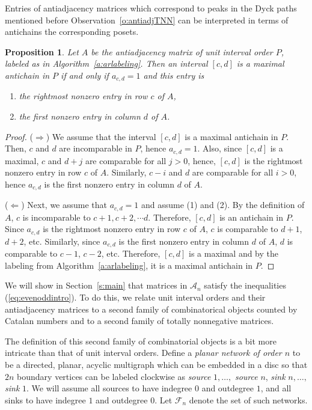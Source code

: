 \documentclass[12pt]{amsart}
\newtheorem{prop}[thm]{Proposition}
\theoremstyle{definition}
\numberwithin{equation}{section}
\newcommand{\A}{\mathcal{A}}
\newcommand{\net}[1]{\mathcal F_{#1}}
\begin{document}
Entries of antiadjacency matrices which correspond to peaks in
the Dyck paths mentioned before Observation~\ref{o:antiadjTNN}
can be interpreted in terms of antichains the corresponding posets.
\begin{prop}\label{p:peak}
  Let $A$ be the antiadjacency matrix of unit interval order $P$,
  labeled as in Algorithm~\ref{a:arlabeling}.  Then an interval $[c,d]$
  is a maximal antichain in $P$ if and only if $a_{c,d} = 1$ and this entry is
  \begin{enumerate}
  \item the rightmost nonzero entry in row $c$ of $A$,
  \item the first nonzero entry in column $d$ of $A$.
  \end{enumerate}
\end{prop}
\begin{proof}

  ($\Rightarrow$) We assume that the interval $[c,d]$ is a maximal antichain in $P$. Then, $c$ and $d$ are incomparable in $P$, hence $a_{c,d} = 1$. Also, since $[c,d]$ is a maximal, $c$ and $d+j$ are comparable for all $j>0$, hence, $[c,d]$ is the rightmost nonzero entry in row $c$ of $A$. Similarly, $c-i$ and $d$ are comparable for all $i>0$, hence $a_{c,d}$ is the first nonzero entry in column $d$ of $A$.

  ($\Leftarrow$) Next, we assume that $a_{c,d} = 1$ and assume (1) and (2). By the definition of $A$, $c$ is incomparable to $c+1,c+2,\cdots d$. Therefore, $[c,d]$ is an antichain in $P$. Since $a_{c,d}$ is the rightmost nonzero entry in row $c$ of $A$, $c$ is comparable to $d+1$, $d+2$, etc. Similarly, since $a_{c,d}$ is the first nonzero entry in column $d$ of $A$, $d$ is comparable to $c-1$, $c-2$, etc. Therefore, $[c,d]$ is a maximal and by the labeling from Algorithm~\ref{a:arlabeling}, it is a maximal antichain in $P$.
\end{proof}

We will show in Section~\ref{s:main}
that matrices in $\A_n$ satisfy the inequalities (\ref{eq:evenoddintro}).
To do this, we relate unit interval orders and their antiadjacency matrices
to a
second family of combinatorical objects counted by Catalan numbers
and to a second family of totally nonnegative matrices.

The definition of this second family of combinatorial objects is
a bit more intricate than that of unit interval orders.
Define a {\em planar network of order $n$}
to be a directed, planar,
acyclic
multigraph
which can be embedded in a disc so that
$2n$ boundary vertices can be labeled clockwise as
{\em source} $1, \dotsc,$ {\em source} $n$,
{\em sink} $n, \dotsc,$ {\em sink} $1$.
We will assume all sources to have indegree $0$ and outdegree $1$,
and all sinks to have indegree $1$ and outdegree $0$.
Let $\net n$ denote the set of such networks.
\end{document}
